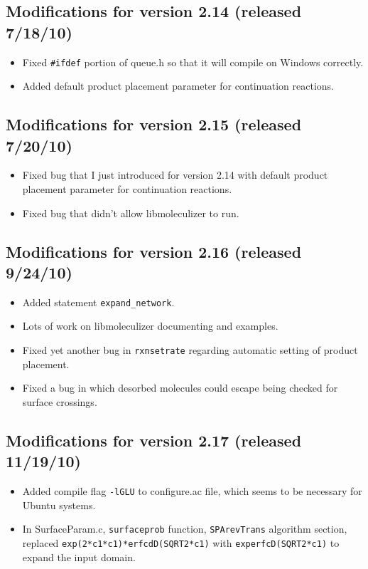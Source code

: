 \documentclass {scrbook}
\newcommand {\ttt} {\texttt}
\begin{document}
\subsection{Modifications for version 2.14 (released 7/18/10)}
\begin{itemize}
\item Fixed \ttt{\#ifdef} portion of queue.h so that it will compile on Windows correctly.
\item Added default product placement parameter for continuation reactions.
\end{itemize}

\subsection{Modifications for version 2.15 (released 7/20/10)}
\begin{itemize}
\item Fixed bug that I just introduced for version 2.14 with default product placement parameter for continuation reactions.
\item Fixed bug that didn't allow libmoleculizer to run.
\end{itemize}

\subsection{Modifications for version 2.16 (released 9/24/10)}
\begin{itemize}
\item Added statement \ttt{expand\_network}.
\item Lots of work on libmoleculizer documenting and examples.
\item Fixed yet another bug in \ttt{rxnsetrate} regarding automatic setting of product placement.
\item Fixed a bug in which desorbed molecules could escape being checked for surface crossings.
\end{itemize}

\subsection{Modifications for version 2.17 (released 11/19/10)}
\begin{itemize}
\item Added compile flag \ttt{-lGLU} to configure.ac file, which seems to be necessary for Ubuntu systems.
\item In SurfaceParam.c, \ttt{surfaceprob} function, \ttt{SPArevTrans} algorithm section, replaced \lstinline{exp(2*c1*c1)*erfcdD(SQRT2*c1)} with \lstinline{experfcD(SQRT2*c1)} to expand the input domain.
\end{itemize}
\end{document}
